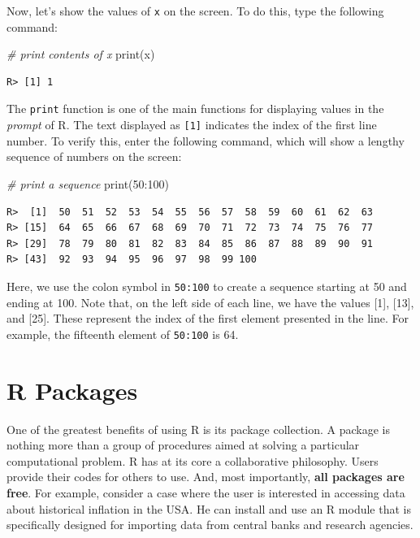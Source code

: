 \documentclass[
  12pt,
]{book}
\newenvironment{Shaded}{\begin{snugshade}}{\end{snugshade}}
\newcommand{\CommentTok}[1]{\textcolor[rgb]{0.37,0.37,0.37}{\textit{#1}}}
\newcommand{\DecValTok}[1]{\textcolor[rgb]{0.06,0.06,0.06}{#1}}
\newcommand{\FunctionTok}[1]{\textcolor[rgb]{0,0,0}{#1}}
\newcommand{\NormalTok}[1]{#1}
\newcommand{\SpecialCharTok}[1]{\textcolor[rgb]{0,0,0}{#1}}
\begin{document}
Now, let's show the values of \texttt{x} on the screen. To do this, type the following command:

\begin{Shaded}
\begin{Highlighting}[]
\CommentTok{\# print contents of x}
\FunctionTok{print}\NormalTok{(x)}
\end{Highlighting}
\end{Shaded}

\begin{verbatim}
R> [1] 1
\end{verbatim}

The \texttt{print} function is one of the main functions for displaying values in the \emph{prompt} of R. The text displayed as \texttt{{[}1{]}} indicates the index of the first line number. To verify this, enter the following command, which will show a lengthy sequence of numbers on the screen: 

\begin{Shaded}
\begin{Highlighting}[]
\CommentTok{\# print a sequence}
\FunctionTok{print}\NormalTok{(}\DecValTok{50}\SpecialCharTok{:}\DecValTok{100}\NormalTok{)}
\end{Highlighting}
\end{Shaded}

\begin{verbatim}
R>  [1]  50  51  52  53  54  55  56  57  58  59  60  61  62  63
R> [15]  64  65  66  67  68  69  70  71  72  73  74  75  76  77
R> [29]  78  79  80  81  82  83  84  85  86  87  88  89  90  91
R> [43]  92  93  94  95  96  97  98  99 100
\end{verbatim}

Here, we use the colon symbol in \texttt{50:100} to create a sequence starting at 50 and ending at 100. Note that, on the left side of each line, we have the values {[}1{]}, {[}13{]}, and {[}25{]}. These represent the index of the first element presented in the line. For example, the fifteenth element of \texttt{50:100} is 64.

\hypertarget{r-packages}{%
\section{R Packages}\label{r-packages}}

One of the greatest benefits of using R is its package collection. A package is nothing more than a group of procedures aimed at solving a particular computational problem. R has at its core a collaborative philosophy. Users provide their codes for others to use. And, most importantly, \textbf{all packages are free}. For example, consider a case where the user is interested in accessing data about historical inflation in the USA. He can install and use an R module that is specifically designed for importing data from central banks and research agencies.
\end{document}
